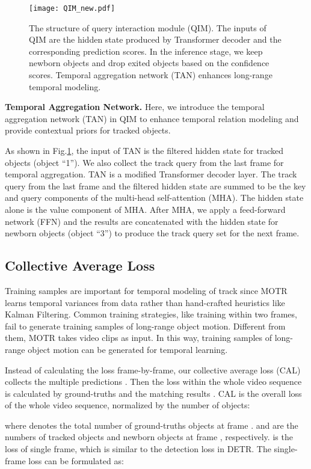 \documentclass[runningheads]{llncs}
\begin{document}
\begin{figure}[t]
  \centering
  \texttt{[image: QIM\_new.pdf]}
  \caption{The structure of query interaction module (QIM). The inputs of QIM are the hidden state produced by Transformer decoder and the corresponding prediction scores. In the inference stage, we keep newborn objects and drop exited objects based on the confidence scores. Temporal aggregation network (TAN) enhances long-range temporal modeling.}
  \label{QIN}
\end{figure}

\noindent \textbf{Temporal Aggregation Network.}
Here, we introduce the temporal aggregation network (TAN) in QIM to enhance temporal relation modeling and provide contextual priors for tracked objects.

As shown in Fig.\;\ref{QIN}, the input of TAN is the filtered hidden state for tracked objects (object ``1'').
We also collect the track query  from the last frame for temporal aggregation.
TAN is a modified Transformer decoder layer. The track query from the last frame and the filtered hidden state are summed to be the key and query components of the multi-head self-attention (MHA).
The hidden state alone is the value component of MHA.
After MHA, we apply a feed-forward network (FFN) and the results are concatenated with the hidden state for newborn objects (object ``3'') to produce the track query set  for the next frame.

\subsection{Collective Average Loss}
\label{collective_loss}
Training samples are important for temporal modeling of track since MOTR learns temporal variances from data rather than hand-crafted heuristics like Kalman Filtering. Common training strategies, like training within two frames, fail to generate training samples of long-range object motion. Different from them, MOTR takes video clips as input. In this way, training samples of long-range object motion can be generated for temporal learning.

Instead of calculating the loss frame-by-frame, our collective average loss (CAL) collects the multiple predictions . Then the loss within the whole video sequence is calculated by ground-truths  and the matching results .
CAL is the overall loss of the whole video sequence, normalized by the number of objects:

where  denotes the total number of ground-truths objects at frame .  and  are the numbers of tracked objects and newborn objects at frame , respectively.  is the loss of single frame, which is similar to the detection loss in DETR. The single-frame loss  can be formulated as:
\end{document}
